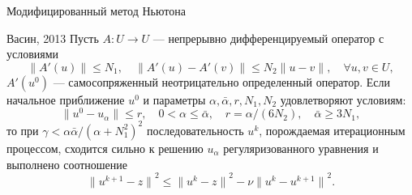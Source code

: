 \documentclass[10pt,pdf, mathserif, hyperref={unicode}]{beamer}
\begin{document}
\begin{frame}{\small Модифицированный метод Ньютона}
	\begin{block}{Васин, 2013}
		Пусть $A: U \to U$ --- непрерывно дифференцируемый оператор с условиями
		$$\|A'(u)\|\le N_1, \quad \|A'(u) - A'(v)\|\le N_2\|u-v\|, \quad \forall u, v \in U,$$
		$A'(u^0)$ --- самосопряженный неотрицательно определенный оператор. Если начальное приближение $u^0$ и параметры $\alpha, \bar{\alpha}, r, N_1, N_2$ удовлетворяют условиям:
		$$\|u^0-u_\alpha\|\le r, \quad 0<\alpha\le \bar{\alpha}, \quad r=\alpha/(6N_2), \quad \bar{\alpha}\ge 3N_1,$$
		то при $\gamma<\alpha\bar{\alpha}/(\alpha+N_1^2)^2$ последовательность $u^k$, порождаемая итерационным процессом, сходится сильно к решению $u_\alpha$ регуляризованного уравнения и выполнено соотношение
		$${\|u^{k+1}-z\|}^2\le{\|u^k-z\|}^2-\nu{\|u^k-u^{k+1}\|}^2.$$
	\end{block}
	\let\thefootnote\relax\let\thefootnote\relax{}
\end{frame}
\end{document}
